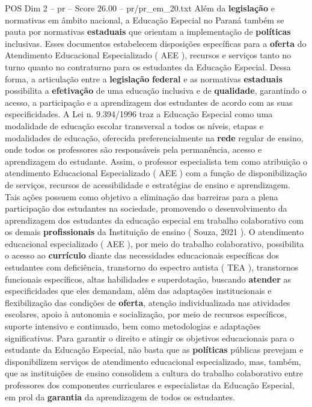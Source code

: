 \begin{textsample}{POS Dim 2 – pr – Score 26.00 – pr/pr\_em\_20.txt}
Além da \textbf{legislação} e normativas em âmbito nacional, a Educação Especial no Paraná também se pauta por normativas \textbf{estaduais} que orientam a implementação de \textbf{políticas} inclusivas.
Esses documentos estabelecem disposições específicas para a \textbf{oferta} do Atendimento Educacional Especializado ( AEE ), recursos e serviços tanto no turno quanto no contraturno para os estudantes da Educação Especial.
Dessa forma, a articulação entre a \textbf{legislação} \textbf{federal} e as normativas \textbf{estaduais} possibilita a \textbf{efetivação} de uma educação inclusiva e de \textbf{qualidade}, garantindo o acesso, a participação e a aprendizagem dos estudantes de acordo com as suas especificidades.
A Lei n. 9.394/1996 traz a Educação Especial como uma modalidade de educação escolar transversal a todos os níveis, etapas e modalidades de educação, oferecida preferencialmente na \textbf{rede} regular de ensino, onde todos os professores são responsáveis pela permanência, acesso e aprendizagem do estudante.
Assim, o professor especialista tem como atribuição o atendimento Educacional Especializado ( AEE ) com a função de disponibilização de serviços, recursos de acessibilidade e estratégias de ensino e aprendizagem.
Tais ações possuem como objetivo a eliminação das barreiras para a plena participação dos estudantes na sociedade, promovendo o desenvolvimento da aprendizagem dos estudantes da educação especial em trabalho colaborativo com os demais \textbf{profissionais} da Instituição de ensino ( Souza, 2021 ).
O atendimento educacional especializado ( AEE ), por meio do trabalho colaborativo, possibilita o acesso ao \textbf{currículo} diante das necessidades educacionais específicas dos estudantes com deficiência, transtorno do espectro autista ( TEA ), transtornos funcionais específicos, altas habilidades e superdotação, buscando \textbf{atender} as especificidades que eles demandam, além das adaptações institucionais e flexibilização das condições de \textbf{oferta}, atenção individualizada nas atividades escolares, apoio à autonomia e socialização, por meio de recursos específicos, suporte intensivo e continuado, bem como metodologias e adaptações significativas.
Para garantir o direito e atingir os objetivos educacionais para o estudante da Educação Especial, não basta que as \textbf{políticas} públicas prevejam e disponibilizem serviços de atendimento educacional especializado, mas, também, que as instituições de ensino consolidem a cultura do trabalho colaborativo entre professores dos componentes curriculares e especialistas da Educação Especial, em prol da \textbf{garantia} da aprendizagem de todos os estudantes.

\end{textsample}
